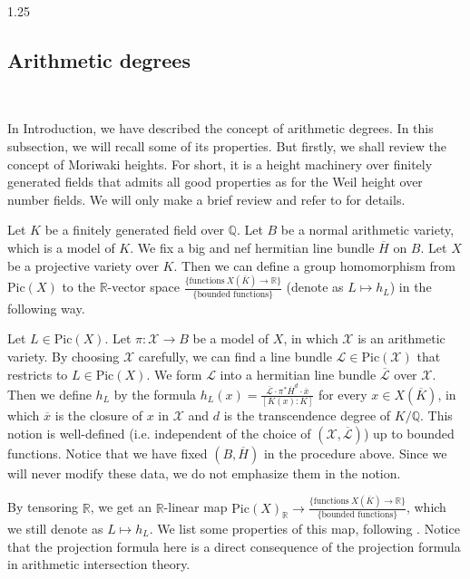 \documentclass[12pt]{amsart}
\begin{document}
\begin{spacing}{1.25}
\subsection{Arithmetic degrees}\label{subsec_arithdeg}

\ 

In Introduction, we have described the concept of arithmetic degrees. In this subsection, we will recall some of its properties. But firstly, we shall review the concept of Moriwaki heights. For short, it is a height machinery over finitely generated fields that admits all good properties as for the Weil height over number fields. We will only make a brief review and refer to \cite{Mor00} for details.

Let $K$ be a finitely generated field over $\mathbb{Q}$. Let $B$ be a normal arithmetic variety, which is a model of $K$. We fix a big and nef hermitian line bundle $\overline{H}$ on $B$. Let $X$ be a projective variety over $K$. Then we can define a group homomorphism from $\mathrm{Pic}(X)$ to the $\mathbb{R}$-vector space $\frac{\{\textrm{functions}\ X(\overline{K})\rightarrow\mathbb{R}\}}{\{\textrm{bounded functions}\}}$ (denote as $L\mapsto h_L$) in the following way.

Let $L\in\mathrm{Pic}(X)$. Let $\pi:\mathcal{X}\rightarrow B$ be a model of $X$, in which $\mathcal{X}$ is an arithmetic variety. By choosing $\mathcal{X}$ carefully, we can find a line bundle $\mathcal{L}\in\mathrm{Pic}(\mathcal{X})$ that restricts to $L\in\mathrm{Pic}(X)$. We form $\mathcal{L}$ into a hermitian line bundle $\overline{\mathcal{L}}$ over $\mathcal{X}$. Then we define $h_L$ by the formula $h_L(x)=\frac{\overline{\mathcal{L}}\cdot\pi^*\overline{H}^d\cdot\overline{x}}{[K(x):K]}$ for every $x\in X(\overline{K})$, in which $\overline{x}$ is the closure of $x$ in $\mathcal{X}$ and $d$ is the transcendence degree of $K/\mathbb{Q}$. This notion is well-defined (i.e. independent of the choice of $(\mathcal{X},\overline{\mathcal{L}})$) up to bounded functions. Notice that we have fixed $(B,\overline{H})$ in the procedure above. Since we will never modify these data, we do not emphasize them in the notion.

By tensoring $\mathbb{R}$, we get an $\mathbb{R}$-linear map $\mathrm{Pic}(X)_{\mathbb{R}}\rightarrow\frac{\{\textrm{functions}\ X(\overline{K})\rightarrow\mathbb{R}\}}{\{\textrm{bounded functions}\}}$, which we still denote as $L\mapsto h_L$. We list some properties of this map, following \cite[Proposition 3.3.7]{Mor00}. Notice that the projection formula here is a direct consequence of the projection formula in arithmetic intersection theory.


\end{spacing}
\end{document}
